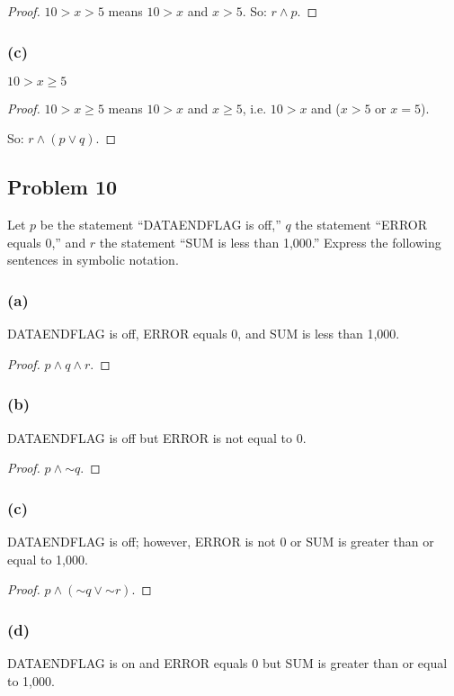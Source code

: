 \documentclass[14pt]{extarticle}
\begin{document}
\begin{proof}
$10 > x > 5$ means $10 > x$ and $x > 5$. So: $r \wedge p$.
\end{proof}

\subsubsection{(c)}
$10 > x \geq 5$

\begin{proof}
$10 > x \geq 5$ means $10 > x$ and $x \geq 5$, i.e. $10 > x$ and
($x > 5$ or $x = 5$).

So: $r \wedge (p \vee q)$.
\end{proof}

\subsection{Problem 10}
Let $p$ be the statement “DATAENDFLAG is off,” $q$ the statement “ERROR equals
0,” and $r$ the statement “SUM is less than 1,000.” Express the following
sentences in symbolic notation.

\subsubsection{(a)}
DATAENDFLAG is off, ERROR equals 0, and SUM is less than 1,000.

\begin{proof}
$p \wedge q \wedge r$.
\end{proof}

\subsubsection{(b)}
DATAENDFLAG is off but ERROR is not equal to 0.

\begin{proof}
$p \wedge {\sim q}$.
\end{proof}

\subsubsection{(c)}
DATAENDFLAG is off; however, ERROR is not 0 or SUM is greater than or equal to
1,000.

\begin{proof}
$p \wedge ({\sim q} \vee {\sim r})$.
\end{proof}

\subsubsection{(d)}
DATAENDFLAG is on and ERROR equals 0 but SUM is greater than or equal to 1,000.
\end{document}

